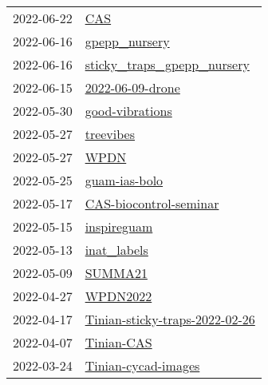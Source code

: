 \begin{longtable}{ll}
2022-06-22 &                                                                   \href{https://github.com/aubreymoore/CAS}{CAS} \\
2022-06-16 &                                               \href{https://github.com/aubreymoore/gpepp_nursery}{gpepp_nursery} \\
2022-06-16 &                     \href{https://github.com/aubreymoore/sticky_traps_gpepp_nursery}{sticky_traps_gpepp_nursery} \\
2022-06-15 &                                         \href{https://github.com/aubreymoore/2022-06-09-drone}{2022-06-09-drone} \\
2022-05-30 &                                           \href{https://github.com/aubreymoore/good-vibrations}{good-vibrations} \\
2022-05-27 &                                                       \href{https://github.com/aubreymoore/treevibes}{treevibes} \\
2022-05-27 &                                                                 \href{https://github.com/aubreymoore/WPDN}{WPDN} \\
2022-05-25 &                                               \href{https://github.com/aubreymoore/guam-ias-bolo}{guam-ias-bolo} \\
2022-05-17 &                             \href{https://github.com/aubreymoore/CAS-biocontrol-seminar}{CAS-biocontrol-seminar} \\
2022-05-15 &                                                   \href{https://github.com/aubreymoore/inspireguam}{inspireguam} \\
2022-05-13 &                                                   \href{https://github.com/aubreymoore/inat_labels}{inat_labels} \\
2022-05-09 &                                                           \href{https://github.com/aubreymoore/SUMMA21}{SUMMA21} \\
2022-04-27 &                                                         \href{https://github.com/aubreymoore/WPDN2022}{WPDN2022} \\
2022-04-17 &             \href{https://github.com/aubreymoore/Tinian-sticky-traps-2022-02-26}{Tinian-sticky-traps-2022-02-26} \\
2022-04-07 &                                                     \href{https://github.com/aubreymoore/Tinian-CAS}{Tinian-CAS} \\
2022-03-24 &                                   \href{https://github.com/aubreymoore/Tinian-cycad-images}{Tinian-cycad-images} \\

\end{longtable}
